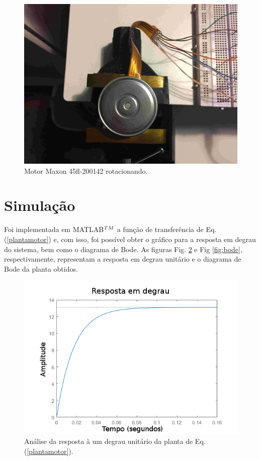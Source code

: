 \documentclass[10pt,fleqn,a4paper]{article}
\begin{document}
	\begin{figure}[ht]
		\begin{center}
			\includegraphics[angle=0, scale=0.06]{images/motornovo}
		\end{center}
		\caption{Motor Maxon 45fl-200142 rotacionando.}
		\label{fig:motornovo}
	\end{figure}

	\newpage
    
    \section{Simulação}
    
    Foi implementada em MATLAB$^{\small{TM}}$ a função de transferência de Eq. (\ref{plantamotor}) e, com isso, foi possível obter o gráfico para a resposta em degrau do sistema, bem como o diagrama de Bode. As figuras Fig. \ref{fig:respostaemdegrau} e Fig \ref{fig:bode}, respectivamente, representam a resposta em degrau unitário e o diagrama de Bode da planta obtidos.

	\begin{figure}[ht]
		\begin{center}
			\includegraphics[angle=0, scale=0.7]{images/stepResponse_review}
		\end{center}
		\caption{Análise da resposta à um degrau unitário da planta de Eq. (\ref{plantamotor}).}
		\label{fig:respostaemdegrau}
	\end{figure}
\end{document}
